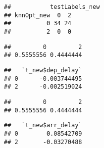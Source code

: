 \documentclass[
  11pt,
]{article}
\newenvironment{Shaded}{\begin{snugshade}}{\end{snugshade}}
\newcommand{\FunctionTok}[1]{\textcolor[rgb]{0.00,0.00,0.00}{#1}}
\newcommand{\NormalTok}[1]{#1}
\newcommand{\OtherTok}[1]{\textcolor[rgb]{0.56,0.35,0.01}{#1}}
\newcommand{\SpecialCharTok}[1]{\textcolor[rgb]{0.00,0.00,0.00}{#1}}
\begin{document}
\begin{verbatim}
##           testLabels_new
## knnOpt_new  0  2
##          0 34 24
##          2  0  0
\end{verbatim}

\begin{Shaded}
\end{Shaded}

\begin{verbatim}
##         0         2 
## 0.5555556 0.4444444
\end{verbatim}

\begin{Shaded}
\end{Shaded}

\begin{verbatim}
##   `t_new$dep_delay`
## 0      -0.003744495
## 2      -0.002519024
\end{verbatim}

\begin{Shaded}
\end{Shaded}

\begin{verbatim}
##         0         2 
## 0.5555556 0.4444444
\end{verbatim}

\begin{Shaded}
\end{Shaded}

\begin{verbatim}
##   `t_new$arr_delay`
## 0        0.08542709
## 2       -0.03270488
\end{verbatim}
\end{document}
